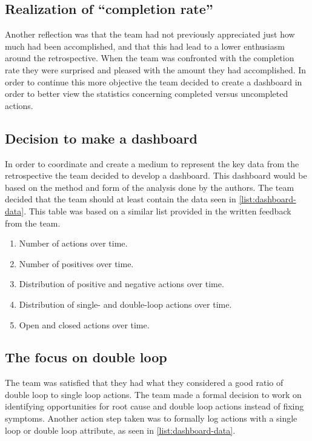 \subsection{Realization of ``completion rate''}
Another reflection was that the team had not previously appreciated just how much had been accomplished, and that this had lead to a lower enthusiasm around the retrospective. When the team was confronted with the completion rate they were surprised and pleased with the amount they had accomplished. In order to continue this more objective the team decided to create a dashboard in order to better view the statistics concerning completed versus uncompleted actions. 

\subsection{Decision to make a dashboard}
In order to coordinate and create a medium to represent the key data from the retrospective the team decided to develop a dashboard. This dashboard would be based on the method and form of the analysis done by the authors.  The team decided that the team should at least contain the data seen in \autoref{list:dashboard-data}. This table was based on a similar list provided in the written feedback from the team. 

\begin{enumerate}
\label{list:dashboard-data}
\item Number of actions over time.
\item Number of positives over time.
\item Distribution of positive and negative actions over time.
\item Distribution of single- and double-loop actions over time.
\item Open and closed actions over time.
\end{enumerate}


\subsection{The focus on double loop}
The team was satisfied that they had what they considered a good ratio of double loop to single loop actions. The team made a formal decision to work on identifying opportunities for root cause and double loop actions instead of fixing symptoms. Another action step taken was to formally log actions with a single loop or double loop attribute, as seen in \autoref{list:dashboard-data}.

